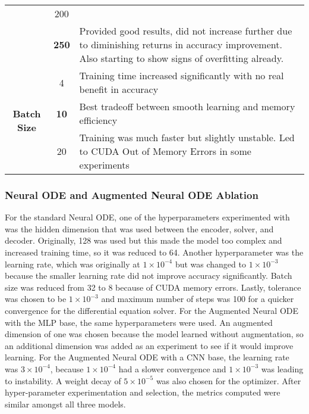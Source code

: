 \documentclass{article}
\begin{document}
\begin{center}
\begin{tabular}{|c|c|p{8cm}|}
& 200 &  \\

& \textbf{250} & Provided good results, did not increase further due to diminishing returns in accuracy improvement. Also starting to show signs of overfitting already.  \\

\midrule

\multirow{3}{*}{\textbf{Batch Size}} 

& 4 & Training time increased significantly with no real benefit in accuracy \\

& \textbf{10} & Best tradeoff between smooth learning and memory efficiency \\

& 20 & Training was much faster but slightly unstable. Led to CUDA Out of Memory Errors in some experiments \\

\bottomrule
\end{tabular}
\end{center}

\subsubsection{Neural ODE and Augmented Neural ODE Ablation}
For the standard Neural ODE, one of the hyperparameters experimented with was the hidden dimension that was used between the encoder, solver, and decoder. Originally, 128 was used but this made the model too complex and increased training time, so it was reduced to 64. Another hyperparameter was the learning rate, which was originally at $1 \times 10^{-4}$ but was changed to $1 \times 10^{-3}$ because the smaller learning rate did not improve accuracy significantly. Batch size was reduced from 32 to 8 because of CUDA memory errors. Lastly, tolerance was chosen to be $1 \times 10^{-3}$ and maximum number of steps was 100 for a quicker convergence for the differential equation solver. For the Augmented Neural ODE with the MLP base, the same hyperparameters were used. An augmented dimension of one was chosen because the model learned without augmentation, so an additional dimension was added as an experiment to see if it would improve learning. For the Augmented Neural ODE with a CNN base, the learning rate was $3\times 10^{-4}$, because $1 \times 10^{-4}$ had a slower convergence and $1 \times 10^{-3}$ was leading to instability. A weight decay of $5 \times 10^{-5}$ was also chosen for the optimizer. After hyper-parameter experimentation and selection, the metrics computed were similar amongst all three models.
\end{document}
